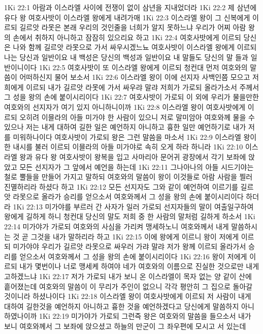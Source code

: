 1Ki 22:1  아람과 이스라엘 사이에 전쟁이 없이 삼년을 지내었더라
1Ki 22:2  제 삼년에 유다 왕 여호사밧이 이스라엘 왕에게 내려가매
1Ki 22:3  이스라엘 왕이 그 신복에게 이르되 길르앗 라못은 본래 우리의 것인줄을 너희가 알지 못하느냐 우리가 어찌 아람 왕의 손에서 취하지 아니하고 잠잠히 있으리요 하고
1Ki 22:4  여호사밧에게 이르되 당신은 나와 함께 길르앗 라못으로 가서 싸우시겠느뇨 여호사밧이 이스라엘 왕에게 이르되 나는 당신과 일반이요 내 백성은 당신의 백성과 일반이요 내 말들도 당신의 말 들과 일반이니이다
1Ki 22:5  여호사밧이 또 이스라엘 왕에게 이르되 청컨대 먼저 여호와의 말씀이 어떠하신지 물어 보소서
1Ki 22:6  이스라엘 왕이 이에 선지자 사백인쯤 모으고 저희에게 이르되 내가 길르앗 라못에 가서 싸우랴 말랴 저희가 가로되 올라가소서 주께서 그 성을 왕의 손에 붙이시리이다
1Ki 22:7  여호사밧이 가로되 이 외에 우리가 물을만한 여호와의 선지자가 여기 있지 아니하니이까
1Ki 22:8  이스라엘 왕이 여호사밧에게 이르되 오히려 이믈라의 아들 미가야 한 사람이 있으니 저로 말미암아 여호와께 물을 수 있으나 저는 내게 대하여 길한 일은 예언하지 아니하고 흉한 일만 예언하기로 내가 저를 미워하나이다 여호사밧이 가로되 왕은 그런 말씀을 마소서
1Ki 22:9  이스라엘 왕이 한 내시를 불러 이르되 이믈라의 아들 미가야로 속히 오게 하라 하니라
1Ki 22:10  이스라엘 왕과 유다 왕 여호사밧이 왕복을 입고 사마리아 문어귀 광장에서 각기 보좌에 앉았고 모든 선지자가 그 앞에서 예언을 하는데
1Ki 22:11  그나아나의 아들 시드기야는 철로 뿔들을 만들어 가지고 말하되 여호와의 말씀이 왕이 이것들로 아람 사람을 찔러 진멸하리라 하셨다 하고
1Ki 22:12  모든 선지자도 그와 같이 예언하여 이르기를 길르앗 라못으로 올라가 승리를 얻으소서 여호와께서 그 성을 왕의 손에 붙이시리이다 하더라
1Ki 22:13  미가야를 부르러 간 사자가 일러 가로되 선지자들의 말이 여출일구하여 왕에게 길하게 하니 청컨대 당신의 말도 저희 중 한 사람의 말처럼 길하게 하소서
1Ki 22:14  미가야가 가로되 여호와의 사심을 가리켜 맹세하노니 여호와께서 내게 말씀하시는 것 곧 그것을 내가 말하리라 하고
1Ki 22:15  이에 왕에게 이르니 왕이 저에게 이르되 미가야야 우리가 길르앗 라못으로 싸우러 가랴 말랴 저가 왕께 이르되 올라가서 승리를 얻으소서 여호와께서 그 성을 왕의 손에 붙이시리이다
1Ki 22:16  왕이 저에게 이르되 내가 몇번이나 너로 맹세케 하여야 네가 여호와의 이름으로 진실한 것으로만 내게 고하겠느냐
1Ki 22:17  저가 가로되 내가 보니 온 이스라엘이 목자 없는 양 같이 산에 흩어졌는데 여호와의 말씀이 이 무리가 주인이 없으니 각각 평안히 그 집으로 돌아갈 것이니라 하셨나이다
1Ki 22:18  이스라엘 왕이 여호사밧에게 이르되 저 사람이 내게 대하여 길한것을 예언하지 아니하고 흉한 것을 예언하겠다고 당신에게 말씀하지 아니하였나이까
1Ki 22:19  미가야가 가로되 그런즉 왕은 여호와의 말씀을 들으소서 내가 보니 여호와께서 그 보좌에 앉으셨고 하늘의 만군이 그 좌우편에 모시고 서 있는데

